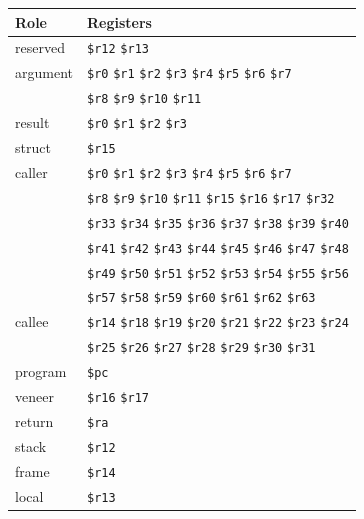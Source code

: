 {\scriptsize
\begin{tabular}{|l|l||} \hline
Role & Registers \\ \hline
reserved &	\verb|$r12| \verb|$r13| \\
argument &	\verb|$r0| \verb|$r1| \verb|$r2| \verb|$r3| \verb|$r4| \verb|$r5| \verb|$r6| \verb|$r7| \\
 &	\verb|$r8| \verb|$r9| \verb|$r10| \verb|$r11| \\
result &	\verb|$r0| \verb|$r1| \verb|$r2| \verb|$r3| \\
struct &	\verb|$r15| \\
caller &	\verb|$r0| \verb|$r1| \verb|$r2| \verb|$r3| \verb|$r4| \verb|$r5| \verb|$r6| \verb|$r7| \\
 &	\verb|$r8| \verb|$r9| \verb|$r10| \verb|$r11| \verb|$r15| \verb|$r16| \verb|$r17| \verb|$r32| \\
 &	\verb|$r33| \verb|$r34| \verb|$r35| \verb|$r36| \verb|$r37| \verb|$r38| \verb|$r39| \verb|$r40| \\
 &	\verb|$r41| \verb|$r42| \verb|$r43| \verb|$r44| \verb|$r45| \verb|$r46| \verb|$r47| \verb|$r48| \\
 &	\verb|$r49| \verb|$r50| \verb|$r51| \verb|$r52| \verb|$r53| \verb|$r54| \verb|$r55| \verb|$r56| \\
 &	\verb|$r57| \verb|$r58| \verb|$r59| \verb|$r60| \verb|$r61| \verb|$r62| \verb|$r63| \\
callee &	\verb|$r14| \verb|$r18| \verb|$r19| \verb|$r20| \verb|$r21| \verb|$r22| \verb|$r23| \verb|$r24| \\
 &	\verb|$r25| \verb|$r26| \verb|$r27| \verb|$r28| \verb|$r29| \verb|$r30| \verb|$r31| \\
program &	\verb|$pc| \\
veneer &	\verb|$r16| \verb|$r17| \\
return &	\verb|$ra| \\
stack &	\verb|$r12| \\
frame &	\verb|$r14| \\
local &	\verb|$r13| \\
\hline \end{tabular}
}
